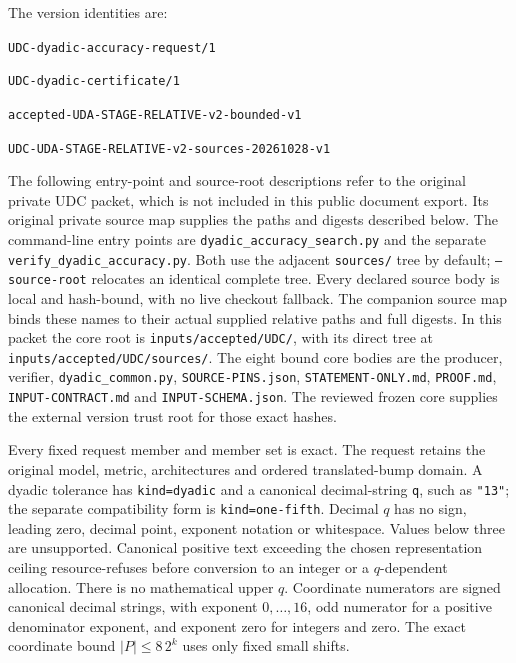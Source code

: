 \documentclass[11pt]{article}
\theoremstyle{plain}
\theoremstyle{definition}
\theoremstyle{remark}
\begin{document}
The version identities are:
\begin{description}[leftmargin=1em,style=nextline,itemsep=0.1em]
\item[Request] \nolinkurl{UDC-dyadic-accuracy-request/1}
\item[Certificate] \nolinkurl{UDC-dyadic-certificate/1}
\item[Backend] \nolinkurl{accepted-UDA-STAGE-RELATIVE-v2-bounded-v1}
\item[Source bundle] \nolinkurl{UDC-UDA-STAGE-RELATIVE-v2-sources-20261028-v1}
\end{description}
The following entry-point and source-root descriptions refer to the original
private UDC packet, which is not included in this public document export.
Its original private source map supplies the paths and digests described below.
The command-line entry points are \nolinkurl{dyadic_accuracy_search.py} and
the separate \nolinkurl{verify_dyadic_accuracy.py}. Both use the adjacent \texttt{sources/}
tree by default; \texttt{--source-root} relocates an identical complete
tree. Every declared source body is local and hash-bound, with no live
checkout fallback. The companion source map binds these names to their
actual supplied relative paths and full digests.
In this packet the core root is \nolinkurl{inputs/accepted/UDC/}, with its
direct tree at \nolinkurl{inputs/accepted/UDC/sources/}. The eight bound core
bodies are the producer, verifier, \nolinkurl{dyadic_common.py},
\nolinkurl{SOURCE-PINS.json}, \nolinkurl{STATEMENT-ONLY.md},
\nolinkurl{PROOF.md}, \nolinkurl{INPUT-CONTRACT.md} and
\nolinkurl{INPUT-SCHEMA.json}. The reviewed frozen core supplies the external
version trust root for those exact hashes.

Every fixed request member and member set is exact. The request retains
the original model, metric, architectures and ordered translated-bump domain.
A dyadic tolerance has \texttt{kind=dyadic} and a canonical decimal-string
\texttt{q}, such as \texttt{"13"}; the separate compatibility form is
\texttt{kind=one-fifth}. Decimal $q$ has no sign, leading zero, decimal point,
exponent notation or whitespace. Values below three are unsupported.
Canonical positive text exceeding the chosen representation ceiling
resource-refuses before conversion to an integer or a $q$-dependent
allocation. There is no mathematical upper $q$. Coordinate numerators are
signed canonical decimal strings, with exponent $0,\ldots,16$, odd numerator
for a positive denominator exponent, and exponent zero for integers and zero.
The exact coordinate bound $|P|\le8\,2^k$ uses only fixed small shifts.
\end{document}
